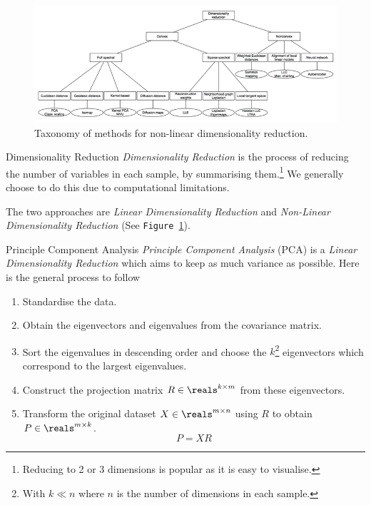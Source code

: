 \documentclass[11pt,a4paper]{article}
\begin{document}
  \begin{figure}[H]
    \centering\includegraphics[width=.7\textwidth]{NonLinearDimensionalityReductionTaxonomy.PNG}
    \caption{Taxonomy of methods for non-linear dimensionality reduction.}
    \label{fig_non_linear_dimensionality_reduction_taxonomy}
  \end{figure}

  \begin{definition}{Dimensionality Reduction}
    \textit{Dimensionality Reduction} is the process of reducing the number of variables in each sample, by summarising them.\footnote{Reducing to 2 or 3 dimensions is popular as it is easy to visualise.} We generally choose to do this due to computational limitations.
    \par The two approaches are \textit{Linear Dimensionality Reduction} and \textit{Non-Linear Dimensionality Reduction} (See \texttt{Figure \ref{fig_non_linear_dimensionality_reduction_taxonomy}}).
  \end{definition}

  \begin{definition}{Principle Component Analysis}
    \textit{Principle Component Analysis} (PCA) is a \textit{Linear Dimensionality Reduction} which aims to keep as much variance as possible. Here is the general process to follow
    \begin{enumerate}
      \item Standardise the data.
      \item Obtain the eigenvectors and eigenvalues from the covariance matrix.
      \item Sort the eigenvalues in descending order and choose the $k$\footnote{With $k\ll n$ where $n$ is the number of dimensions in each sample.} eigenvectors which correspond to the largest eigenvalues.
      \item Construct the projection matrix $R\in\reals^{k\times m}$ from these eigenvectors.
      \item Transform the original dataset $X\in\reals^{m\times n}$ using $R$ to obtain $P\in\reals^{m\times k}$.
      \[ P=XR \]
    \end{enumerate}
  \end{definition}
\end{document}
